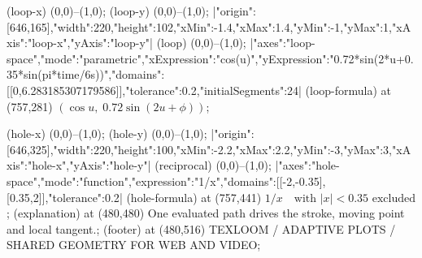 \documentclass{article}
\begin{document}
\begin{loomscene}[width=960,height=540,duration=12,title={From a formula to a moving curve}]
\loomgeometry[draw=rule,line width=.65bp] (loop-x) {(0,0)--(1,0)};
\loomgeometry[draw=rule,line width=.65bp] (loop-y) {(0,0)--(1,0)};
|{"origin":[646,165],"width":220,"height":102,"xMin":-1.4,"xMax":1.4,"yMin":-1,"yMax":1,"xAxis":"loop-x","yAxis":"loop-y"}|
\loomgeometry[draw=gold,line width=2bp] (loop) {(0,0)--(1,0)};
|{"axes":"loop-space","mode":"parametric","xExpression":"cos(u)","yExpression":"0.72*sin(2*u+0.35*sin(pi*time/6s))","domains":[[0,6.283185307179586]],"tolerance":0.2,"initialSegments":24}|
\loomnode[caption] (loop-formula) at (757,281) {$(\cos u,\;0.72\sin(2u+\phi))$};

\loomgeometry[draw=rule,line width=.65bp] (hole-x) {(0,0)--(1,0)};
\loomgeometry[draw=rule,line width=.65bp] (hole-y) {(0,0)--(1,0)};
|{"origin":[646,325],"width":220,"height":100,"xMin":-2.2,"xMax":2.2,"yMin":-3,"yMax":3,"xAxis":"hole-x","yAxis":"hole-y"}|
\loomgeometry[draw=coral,line width=2bp] (reciprocal) {(0,0)--(1,0)};
|{"axes":"hole-space","mode":"function","expression":"1/x","domains":[[-2,-0.35],[0.35,2]],"tolerance":0.2}|
\loomnode[caption] (hole-formula) at (757,441) {$1/x\quad\text{with }|x|<0.35\text{ excluded}$};
\loomnode[small] (explanation) at (480,480) {One evaluated path drives the stroke, moving point and local tangent.};
\loomnode[caption] (footer) at (480,516) {TEXLOOM / ADAPTIVE PLOTS / SHARED GEOMETRY FOR WEB AND VIDEO};
\end{loomscene}
\end{document}
